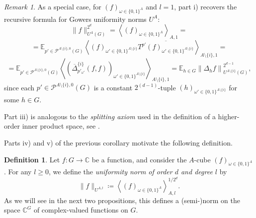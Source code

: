 \documentclass{amsart}
\theoremstyle{definition}
\newtheorem{definition}[theorem]{Definition}
\theoremstyle{remark}
\newtheorem{remark}[theorem]{Remark}
\numberwithin{equation}{section}
\begin{document}
\begin{remark} As a special case, for $\left( f \right)_{\omega \in \{0,1\} ^A}$ and $l=1$, part i) recovers the recursive formula for Gowers uniformity norms $U^A$:
$$ \|f\|_{U^A(G)}^{2^d} = 
\left\langle (f)_{\omega \in  \{0,1\}^A} \right\rangle_{A,1}  
=$$
$$ = \mathbb{E}_{p'  \in \mathcal{P}^{A\setminus\{i\},0}(G)}  \left\langle  \left(f\right)_{\omega' \in  \{0,1\}^{A\setminus\{i\} }}  \overline{T^{p'}\left(f\right)_{\omega' \in  \{0,1\}^{A\setminus\{i\} }}} \right\rangle_{A\setminus \{i\},1}= $$
$$ = \mathbb{E}_{p'  \in \mathcal{P}^{A\setminus\{i\},0}(G)} \left\langle \left(\overline{\Delta}^{\{i\}}_{p'_{\omega'}} (f,f) \right)_{\omega' \in  \{0,1\}^{A\setminus\{i\} }}
\right\rangle_{A\setminus \{i\},1} = 
\mathbb{E}_{h \in G} \left\|\Delta_{h} f \right\|^{2^{d-1}}_{U^{A\setminus\{i\}}(G)},$$
since each $p'  \in \mathcal{P}^{A\setminus\{i\},0}(G)$ is a constant $2^{(d-1)}$-tuple $(h)_{\omega' \in  \{0,1\}^{A\setminus\{i\} }}$ for some $h \in G$.

Part iii) is analogous to the \emph{splitting axiom} used in the definition of a higher-order inner product space, see 
\cite[Definition~2.2.1]{Tao12}. 

%
\end{remark}

Parts iv) and v) of the previous corollary motivate the following definition. 

\begin{definition}
Let $f: G \to \mathbb{C}$ be a function, and consider the $A$-cube $(f)_{\omega \in \{0,1\}^A}$. For any $l \ge 0$, we define the \textit{uniformity norm of order $d $ and degree $l$} by
$$
\|f\|_{U^{A,l}} \coloneqq \left\langle \left(f\right)_{\omega \in \{0,1\}^A} \right\rangle_{A,l}^{1/{2^d}}.
$$
As we will see in the next two propositions, this defines a (semi-)norm on the space $\mathbb{C}^G$ of complex-valued functions on $G$.
\end{definition} 
\end{document}
